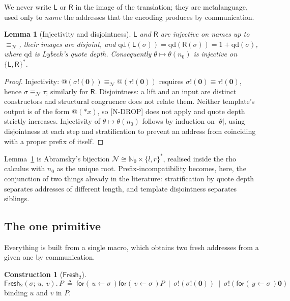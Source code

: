 \documentclass[11pt]{article}
\makeatletter
\theoremstyle{definition}
\newtheorem{construction}[definition]{Construction}
\theoremstyle{plain}
\newtheorem{lemma}[definition]{Lemma}
\theoremstyle{remark}
\newcommand{\quo}[1]{@#1}
\newcommand{\drp}[1]{{*}#1}
\newcommand{\inp}[3]{\mathsf{for}(\,#1 \leftarrow #2\,)#3}
\newcommand{\out}[2]{#1!(#2)}
\newcommand{\nequiv}{\equiv_{\mathcal{N}}}
\newcommand{\nil}{\mathbf{0}}
\newcommand{\Lft}{\mathsf{L}}
\newcommand{\Rgt}{\mathsf{R}}
\newcommand{\Frsh}{\mathsf{Fresh}_2}
\newcommand{\QD}{\mathrm{qd}}
\makeatother
\begin{document}
We never write $\Lft$ or $\Rgt$ in the image of the translation; they are
metalanguage, used only to \emph{name} the addresses that the encoding
produces by communication.

\begin{lemma}[Injectivity and disjointness]\label{lem:templates}
$\Lft$ and $\Rgt$ are injective on names up to $\nequiv$, their images are
disjoint, and $\QD(\Lft(\sigma)) = \QD(\Rgt(\sigma)) = 1 + \QD(\sigma)$,
where $\QD$ is Lybech's quote depth. Consequently
$\theta \mapsto \theta(n_0)$ is injective on $\{\Lft,\Rgt\}^*$.
\end{lemma}

\begin{proof}
Injectivity: $\quo{(\out{\sigma}{\nil})} \nequiv \quo{(\out{\tau}{\nil})}$
requires $\out{\sigma}{\nil} \equiv \out{\tau}{\nil}$, hence
$\sigma \nequiv \tau$; similarly for $\Rgt$. Disjointness: a lift and an
input are distinct constructors and structural congruence does not relate
them. Neither template's output is of the form $\quo{(\drp{x})}$, so
[N-DROP] does not apply and quote depth strictly increases. Injectivity of
$\theta \mapsto \theta(n_0)$ follows by induction on $|\theta|$, using
disjointness at each step and stratification to prevent an address from
coinciding with a proper prefix of itself.
\end{proof}

Lemma~\ref{lem:templates} is Abramsky's bijection
$\mathcal{N} \cong \mathbb{N}_0 \times \{l,r\}^*$, realised inside the rho
calculus with $n_0$ as the unique root. Prefix-incompatibility becomes,
here, the conjunction of two things already in the literature:
stratification by quote depth separates addresses of different length,
and template disjointness separates siblings.

\subsection{The one primitive}

Everything is built from a single macro, which obtains two fresh addresses
from a given one by communication.

\begin{construction}[$\Frsh$]
\[
  \Frsh(\sigma;\, u,\, v).\,P
  \ \triangleq\
  \inp{u}{\sigma}{\inp{v}{\sigma}{P}}
  \ \mid\ \out{\sigma}{\out{\sigma}{\nil}}
  \ \mid\ \out{\sigma}{\inp{y}{\sigma}{\nil}}
\]
binding $u$ and $v$ in $P$.
\end{construction}
\end{document}
